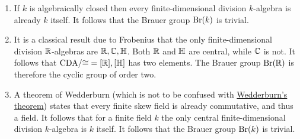 \begin{example}
  \leavevmode
  \begin{enumerate}
    \item
      If $k$ is algebraically closed then every finite-dimensional division $k$-algebra is already $k$ itself.
      It follows that the Brauer group $\operatorname{Br}(k)$ is trivial.
    \item
      It is a classical result due to Frobenius that the only finite-dimensional division $\mathbb{R}$-algebras are $\mathbb{R}, \mathbb{C}, \mathbb{H}$.
      Both $\mathbb{R}$ and $\mathbb{H}$ are central, while $\mathbb{C}$ is not.
      It follows that $\operatorname{CDA}\!/{\cong} = {[\mathbb{R}], [\mathbb{H}]}$ has two elements.
      The Brauer group $\operatorname{Br}(\mathbb{R})$ is therefore the cyclic group of order two.
    \item
      A theorem of Wedderburn (which is not to be confused with \hyperref[theorem: wedderburns theorem]{Wedderburn’s theorem}) states that every finite skew field is already commutative, and thus a field.
      It follows that for a finite field $k$ the only central finite-dimensional division $k$-algebra is $k$ itself.
      It follows that the Brauer group $\operatorname{Br}(k)$ is trivial.
  \end{enumerate}
\end{example}




